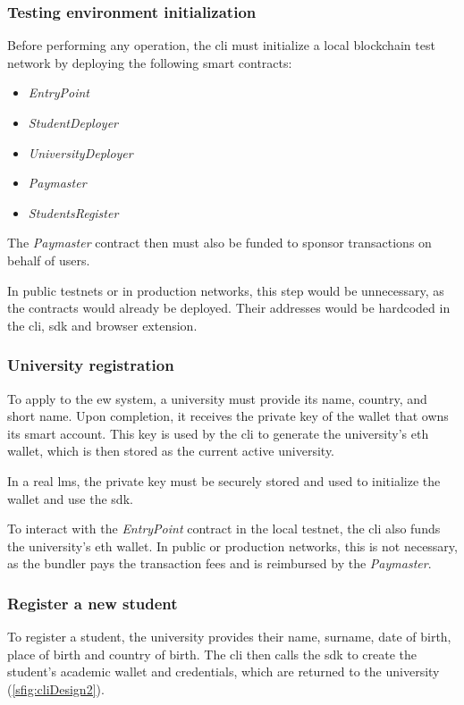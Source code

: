 \subsubsection{Testing environment initialization}
Before performing any operation, the \acrshort{cli} must initialize a local blockchain test network by deploying the following smart contracts:
\begin{itemize}
    \item \textit{EntryPoint}
    \item \textit{StudentDeployer}
    \item \textit{UniversityDeployer}
    \item \textit{Paymaster}
    \item \textit{StudentsRegister}
\end{itemize}
The \textit{Paymaster} contract then must also be funded to sponsor transactions on behalf of users.

In public testnets or in production networks, this step would be unnecessary, as the contracts would already be deployed. Their addresses would be hardcoded in the \acrshort{cli}, \acrshort{sdk} and browser extension.

\subsubsection{University registration}
\label{sssec:applyEw}
To apply to the \acrshort{ew} system, a university must provide its name, country, and short name. Upon completion, it receives the private key of the wallet that owns its smart account. This key is used by the \acrshort{cli} to generate the university's \acrlong{eth} wallet, which is then stored as the current active university.

In a real \acrshort{lms}, the private key must be securely stored and used to initialize the wallet and use the \acrshort{sdk}. 

To interact with the \textit{EntryPoint}  contract in the local testnet, the \acrshort{cli} also funds the university's \acrshort{eth} wallet. In public or production networks, this is not necessary, as the bundler pays the transaction fees and is reimbursed by the \textit{Paymaster}.

\subsubsection{Register a new student}
To register a student, the  university provides their name, surname, date of birth, place of birth and country of birth. The \acrshort{cli} then calls the \acrshort{sdk} to create the student's academic wallet and credentials, which are returned to the university (\cref{sfig:cliDesign2}).


